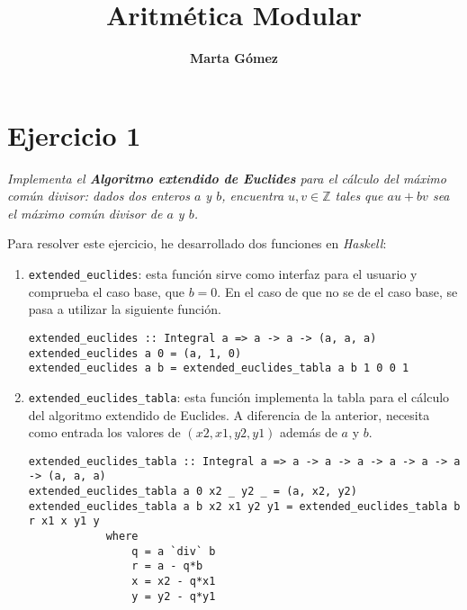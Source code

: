 \documentclass[10pt,spanish]{article}
\title{\fontfamily{pag}\selectfont \bfseries \Huge \color{rojo} Aritmética Modular}
\author{\fontfamily{pag}\selectfont \bfseries \LARGE Marta Gómez}
\begin{document}
\maketitle
\tableofcontents

\renewcommand{\tablename}{Tabla}

\section{\textcolor{rojo}Ejercicio 1}
\textit{Implementa el \textbf{\textcolor{rojo}{Algoritmo extendido de Euclides}} para el cálculo del máximo común divisor: dados dos enteros $a$ y $b$, encuentra $u, v \in \mathbb{Z}$ tales que $au + bv$ sea el máximo común divisor de $a$ y $b$.}

Para resolver este ejercicio, he desarrollado dos funciones en \textit{\textcolor{rojo}{Haskell}}:

\begin{enumerate}[---]
    \item \texttt{extended\_euclides}: esta función sirve como interfaz para el usuario y comprueba el caso base, que $b=0$. En el caso de que no se de el caso base, se pasa a utilizar la siguiente función.

\begin{verbatim}
extended_euclides :: Integral a => a -> a -> (a, a, a)
extended_euclides a 0 = (a, 1, 0)
extended_euclides a b = extended_euclides_tabla a b 1 0 0 1

\end{verbatim}

    \item \texttt{extended\_euclides\_tabla}: esta  función implementa la tabla para el cálculo del algoritmo extendido de Euclides. A diferencia de la anterior, necesita como entrada los valores de $(x2, x1, y2, y1)$ además de $a$ y $b$. 

\begin{verbatim}
extended_euclides_tabla :: Integral a => a -> a -> a -> a -> a -> a -> (a, a, a)
extended_euclides_tabla a 0 x2 _ y2 _ = (a, x2, y2)
extended_euclides_tabla a b x2 x1 y2 y1 = extended_euclides_tabla b r x1 x y1 y
            where
                q = a `div` b
                r = a - q*b
                x = x2 - q*x1
                y = y2 - q*y1

\end{verbatim}
\end{enumerate}
\end{document}
